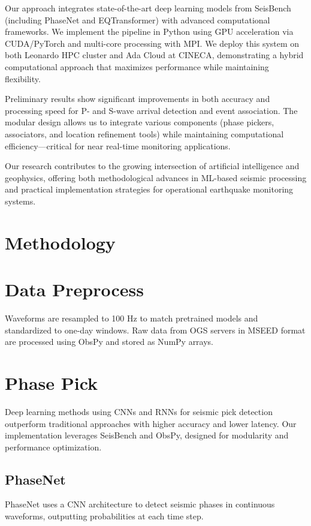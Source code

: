 \documentclass{llncs}
\begin{document}
Our approach integrates state-of-the-art deep learning models from SeisBench
(including PhaseNet and EQTransformer) with advanced computational frameworks.
We implement the pipeline in Python using GPU acceleration via CUDA/PyTorch
and multi-core processing with MPI. We deploy this system on both Leonardo HPC
cluster and Ada Cloud at CINECA, demonstrating a hybrid computational approach
that maximizes performance while maintaining flexibility.

Preliminary results show significant improvements in both accuracy and
processing speed for P- and S-wave arrival detection and event association. The
modular design allows us to integrate various components (phase pickers,
associators, and location refinement tools) while maintaining computational
efficiency—critical for near real-time monitoring applications.

Our research contributes to the growing intersection of artificial 
intelligence and geophysics, offering both methodological advances in ML-based 
seismic processing and practical implementation strategies for operational
earthquake monitoring systems.

\section{Methodology}
\section{Data Preprocess}
\label{sec:data_preprocess}
Waveforms are resampled to 100 Hz to match pretrained models and standardized to one-day windows. Raw data from OGS servers in MSEED format are processed using ObsPy and stored as NumPy arrays.

\section{Phase Pick}
\label{sec:phase_pick}
Deep learning methods using CNNs and RNNs for seismic pick detection outperform traditional approaches with higher accuracy and lower latency. Our implementation leverages SeisBench and ObsPy, designed for modularity and performance optimization.

\subsection{PhaseNet}
\label{subsec:PhaseNet}
PhaseNet \cite{PhaseNet} uses a CNN architecture to detect seismic phases in continuous waveforms, outputting probabilities at each time step.
\end{document}
